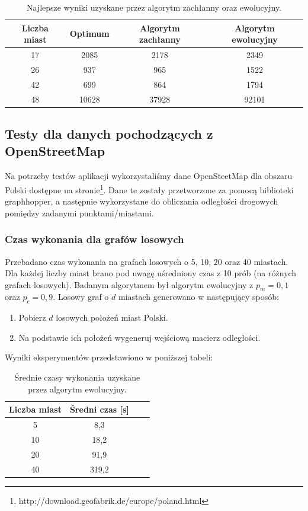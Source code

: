 \documentclass[12pt, a4paper]{article}
\begin{document}
\begin{table}[h]
\centering
	\begin{tabular}{ | c | c | c | c | } 
		\hline
  		Liczba miast & Optimum & Algorytm zachłanny & Algorytm ewolucyjny \\
  		\hline
  		17 & 2085 & 2178 & 2349 \\
  		\hline
  		26 & 937 & 965 & 1522\\
  		\hline
  		42 & 699 & 864 & 1794\\
  		\hline
  		48 & 10628 & 37928 & 92101\\
  		\hline
	\end{tabular}
\caption{Najlepsze wyniki uzyskane przez algorytm zachłanny oraz ewolucyjny.}
\end{table}
\FloatBarrier

\subsection{Testy dla danych pochodzących z OpenStreetMap}
Na potrzeby testów aplikacji wykorzystaliśmy dane OpenSteetMap dla obszaru Polski dostępne na stronie\footnote{{http://download.geofabrik.de/europe/poland.html}}. Dane te zostały przetworzone za pomocą biblioteki graphhopper, a następnie wykorzystane do obliczania odległości drogowych pomiędzy zadanymi punktami/miastami. 

\subsubsection{Czas wykonania dla grafów losowych}
Przebadano czas wykonania na grafach losowych o 5, 10, 20 oraz 40 miastach.
Dla każdej liczby miast brano pod uwagę uśredniony czas z 10 prób (na różnych grafach losowych).
Badanym algorytmem był algorytm ewolucyjny z $p_m=0,1$ oraz $p_c=0,9$.
Losowy graf o $d$ miastach generowano w następujący sposób:

\begin{enumerate}
 \item Pobierz $d$ losowych położeń miast Polski.
 \item Na podstawie ich położeń wygeneruj wejściową macierz odległości.
\end{enumerate}

Wyniki eksperymentów przedstawiono w poniższej tabeli:

\begin{table}[h]
\centering
	\begin{tabular}{ | c | c | c | c | } 
		\hline
  		Liczba miast & Średni czas [s] \\
  		\hline
  		5 & 8,3 \\
  		\hline
  		10 & 18,2 \\
  		\hline
  		20 & 91,9 \\
  		\hline
  		40 & 319,2 \\
  		\hline
	\end{tabular}
\caption{Średnie czasy wykonania uzyskane przez algorytm ewolucyjny.}
\end{table}
\end{document}
